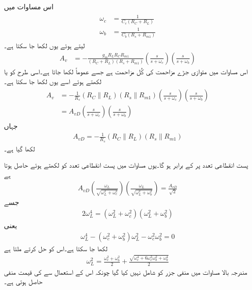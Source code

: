 اس مساوات میں
\begin{gather}
\begin{aligned}\label{مساوات_تعددی_ردعمل_قابو_محاصل_کپیسٹر_سادہ_مساوات}
\omega_c&=\frac{1}{C_c \left(R_C+R_L \right)}\\
\omega_b&=\frac{1}{C_b \left(R_s+R_{m1} \right)}
\end{aligned}
\end{gather}
لیتے ہوئے یوں لکھا جا سکتا ہے۔
\begin{align}
A_v&=-\frac{g_m R_L R_C R_{m1}}{\left(R_C+R_L \right)\left(R_s+R_{m1} \right)}\left(\frac{s}{s+\omega_c} \right)\left(\frac{s}{s+\omega_b} \right)
\end{align}
اس مساوات میں  متوازی جڑے مزاحمت کی کُل مزاحمت ہے جسے عموماً  لکھا جاتا ہے۔اسی طرح  کو  یا لکھتے ہوئے اسے یوں لکھا جا سکتا ہے۔
\begin{gather}
\begin{aligned}\label{مساوات_تعددی_ردعمل_قابو_محاصل_کپیسٹر}
A_v&=-\frac{1}{R_s} \left(\mathbin{R_C \| R_L} \right) \left( \mathbin{R_s \| R_{m1}}\right)\left(\frac{s}{s+\omega_c} \right)\left(\frac{s}{s+\omega_b} \right)\\
&=A_{vD}\left(\frac{s}{s+\omega_c} \right)\left(\frac{s}{s+\omega_b} \right)
\end{aligned}
\end{gather}
جہاں
\begin{align*}
A_{vD}=-\frac{1}{R_s} \left(\mathbin{R_C \| R_L} \right) \left( \mathbin{R_s \| R_{m1}}\right)
\end{align*}
لکھا گیا ہے۔

پست انقطاعی تعدد پر  کے برابر ہو گا۔یوں مساوات  میں پست انقطاعی تعدد کو  لکھتے ہوئے حاصل ہوتا ہے
\begin{align*}
A_{vD} \left(\frac{\omega_L}{\sqrt{\omega_L^2+\omega_c^2}} \right)\left(\frac{\omega_L}{\sqrt{\omega_L^2+\omega_b^2}} \right)=\frac{A_{vD}}{\sqrt{2}}
\end{align*}
جسے
\begin{align*}
2 \omega_L^4=\left(\omega_L^2+\omega_c^2 \right)\left(\omega_L^2+\omega_b^2\right)
\end{align*}
یعنی
\begin{align*}
\omega_L^4-\left(\omega_c^2+\omega_b^2 \right) \omega_L^2 -\omega_c^2 \omega_b^2=0
\end{align*}
لکھا جا سکتا ہے۔اس کو حل کرتے ملتا ہے
\begin{align}\label{مساوات_تعددی_ردعمل_قابو_محاصل_کپیسٹر_انقطاعی_تعدد}
\omega_L^2=\frac{\omega_c^2+\omega_b^2}{2}+\frac{\sqrt{\omega_c^4+6 \omega_c^2 \omega_b^2+\omega_b^4}}{2}
\end{align}
مندرجہ بالا مساوات میں منفی  جزر  کو شامل نہیں کیا گیا چونکہ اس کے استعمال سے  کی قیمت منفی حاصل ہوتی ہے۔

